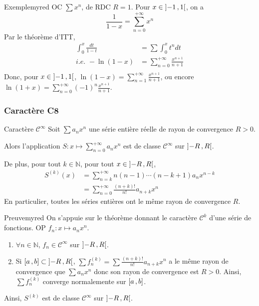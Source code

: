     \begin{omed}{Exemple}{myred}
        OC $\sum x^n$, de RDC $R = 1$. Pour $x \in \left] -1 \, , 1 \right[$, on a 
        \[ \frac{1}{1-x} = \sum_{n=0}^{+\infty} x^n \]   
        Par le théorème d’ITT, 
        \begin{align*}
            \int_{0}^{x} \frac{dt}{1-t} 
            &= \sum \int_{0}^{x} t^n dt \\
            \textit{i.e. } -\ln(1-x) 
            &= \sum_{n=0}^{+\infty} \frac{x^{n+1}}{n+1} \\
        \end{align*}
        Donc, pour $x \in \left] -1 \, , 1 \right[$, $\ln(1-x) = \sum_{n=1}^{+\infty} \frac{x^{n+1}}{n+1}$, ou encore $\ln(1+x) = \sum_{n=0}^{+\infty} (-1)^n \frac{x^{n+1}}{n+1}$.
    \end{omed}

    \subsubsection{Caractère C8}

    \begin{theo}{Caractère $\mathcal{C}^{\infty}$}{}
        Soit $\sum a_n x^n$ une série entière \textcolor{myred}{réelle} de rayon de convergence $R > 0$. 

        Alors l’application $S : x \mapsto \sum_{n=0}^{+\infty} a_n x^n$ est de classe $\mathcal{C}^{\infty}$ sur $\left] -R \, , R \right[$.

        De plus, pour tout $k \in \mathbb{N}$, pour tout $x \in \left] -R \, , R \right[$,
        \begin{align*}
            S^{(k)}(x) 
            &= \sum_{n=k}^{+\infty} n(n-1) \cdots (n-k+1) a_n x^{n-k} \\
            &= \sum_{n=0}^{+\infty} \frac{(n+k)!}{n!} a_{n+k} x^n
        \end{align*}
        En particulier, toutes les séries entières ont le même rayon de convergence $R$.
    \end{theo}

    \begin{demo}{Preuve}{myred}
        On s’appuie sur le théorème donnant le caractère $\mathcal{C}^k$ d’une série de fonctions. OP $f_n : x \mapsto a_n x^n$.
        \begin{enumerate}[label=$(h_{\alph*})$]
            \item $\forall n \in \mathbb{N}$, $f_n \in \mathcal{C}^{\infty}$ sur $\left] -R \, , R \right[$.
            \item Si $\left[ a \, , b \right] \subset \left] -R \, , R \right[$, $\sum f_n^{(k)} = \sum \frac{(n+k)!}{n!} a_{n+k} x^n$ a le même rayon de convergence que $\sum a_n x^n$ donc son rayon de convergence est $R > 0$. Ainsi, $\sum f_n^{(k)}$ converge normalemente sur $\left[ a \, , b \right]$.
        \end{enumerate}
        Ainsi, $S^{(k)}$ est de classe $\mathcal{C}^{\infty}$ sur $\left] -R \, , R \right[$.
    \end{demo}

